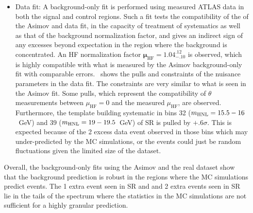 \begin{itemize}
    \item Data fit: A background-only fit is performed using measured ATLAS data in both the signal and control regions. Such a fit tests the compatibility of the of the Asimov and data fit, in the capacity of treatment of systematics as well as that of the background normalization factor, and gives an indirect sign of any excesses beyond expectation in the region where the background is concentrated. An HF normalization factor $\mathbf{\mu_\mathrm{HF}=1.04^{.12}_{-.10}}$ is observed, which is highly compatible with what is measured by the Asimov background-only fit with comparable errors.~ shows the pulls and constraints of the nuisance parameters in the data fit. The constraints are very similar to what is seen in the Asimov fit. Some pulls, which represent the compatibility of $\theta$ measurements between $\mu_\mathrm{HF}=0$ and the measured $\mu_\mathrm{HF}$, are observed. Furthermore, the template building systematic in bins 32 ($m_{\mathrm{HNL}}=15.5-16$~GeV) and 39 ($m_{\mathrm{HNL}}=19-19.5$~GeV) of SR \euu is pulled by $+.6\sigma$. This is expected because of the 2 excess data event observed in those bins which may under-predicted by the MC simulations, or the events could just be random fluctuations given the limited size of the dataset.
\end{itemize}

Overall, the background-only fits using the Asimov and the real dataset show that the background prediction is robust in the regions where the MC simulations predict events. The 1 extra event seen in SR \eeu and and 2 extra events seen in SR \euu lie in the tails of the \mhnl spectrum where the statistics in the MC simulations are not sufficient for a highly granular prediction.